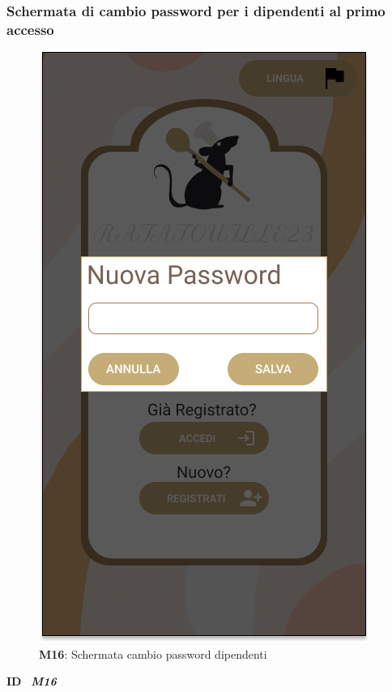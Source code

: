                 \subsubsection{Schermata di cambio password per i dipendenti al primo accesso}
                    \begin{figure}[H]
                      \centering
                      \includegraphics[scale=0.35]{assets/Mockup/Mockup_WorkerChangePass.png}
                      \caption*{\textbf{M16}: Schermata cambio password dipendenti}\label{fig:Mockup_WorkerChangePass}
                    \end{figure}
          
                    \begin{flushleft}
                      \textbf{ID}   \ \Large{\textit{\textbf{M16}}}
                    \end{flushleft}
          
